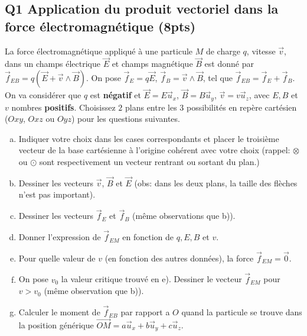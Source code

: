 \documentclass[french,10pt,twocolumn]{article}
\begin{document}
	\FloatBarrier
	
	\subsection*{Q1 Application du produit vectoriel dans la force électromagnétique (8pts)}
	La force électromagnétique appliqué à une particule $M$ de charge $q$, vitesse $\vec{v}$, dans un champs électrique $\vec{E}$ et champs magnétique $\vec{B}$ est donné par $\vec{f}_{EB} = q (\vec{E} + \vec{v} \wedge \vec{B})$. On pose $\vec{f}_E = q \vec{E}$, $\vec{f}_B = \vec{v} \wedge \vec{B}$, tel que $\vec{f}_{EB} = \vec{f}_E + \vec{f}_B$. On va considérer que $q$ est \textbf{négatif} et $\vec{E} = E \vec{u}_x$, $\vec{B} = B \vec{u}_y$, $\vec{v} = v \vec{u}_z$, avec $E, B$ et $v$ nombres \textbf{positifs}. Choisissez $2$ plans entre les $3$ possibilités en repère cartésien ($Oxy$, $Oxz$ ou $Oyz$) pour les questions suivantes. 
	\begin{enumerate}[a)]
		\item Indiquer votre choix dans les cases correspondants et placer le troisième vecteur de la base cartésienne à l'origine cohérent avec votre choix (rappel: $\otimes$ ou $\odot$  sont respectivement un vecteur rentrant ou sortant du plan.) 
		\item Dessiner les vecteurs $\vec{v}$, $\vec{B}$ et $\vec{E}$ (obs: dans les deux plans, la taille des flèches n'est pas important).
		\item Dessiner les vecteurs $\vec{f}_E$ et $\vec{f}_B$ (même observations que b)). 
		\item Donner l'expression de $\vec{f}_{EM}$ en fonction de $q, E, B$ et $v$.
		\item Pour quelle valeur de $v$ (en fonction des autres données), la force $\vec{f}_{EM} = \vec{0}$.
		\item On pose $v_0$ la valeur critique trouvé en e). Dessiner le vecteur $\vec{f}_{EM}$ pour $v>v_0$ (même observation que b)).
		\item Calculer le moment de $\vec{f}_{EB}$ par rapport a $O$ quand la particule se trouve dans la position générique $\vec{OM} = a\vec{u}_x + b\vec{u}_y + c\vec{u}_z$.
	\end{enumerate}
	
\end{document}
